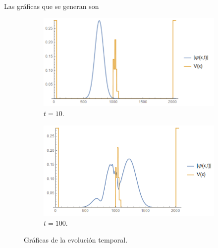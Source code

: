 \documentclass[letterpaper,11pt]{article}
\begin{document}
Las gráficas que se generan son
\begin{figure}[h!]
\begin{subfigure}{.5\textwidth}
	\centering
	\includegraphics[scale=0.60]{img/grafica1}
	\caption{$t = 10$.}
\end{subfigure}%
\begin{subfigure}{.5\textwidth}
	\centering
	\includegraphics[scale=0.60]{img/grafica2}
	\caption{$t=100$.}
\end{subfigure}%
\caption{Gráficas de la evolución temporal.}
\end{figure}
\end{document}
